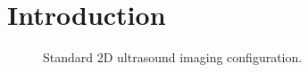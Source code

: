 \documentclass{article}
\newcommand{\vect}[1]{\bm{#1}}
\newcommand{\ser}[2]{#1^{#2}}
\theoremstyle{definition}
\begin{document}
\section{Introduction}
\label{sec_intro}
\begin{figure}[htb]
	\centering
	
	\caption{Standard 2D ultrasound imaging configuration.}
	\label{fig_pulse_echo}
\end{figure}

\end{document}
